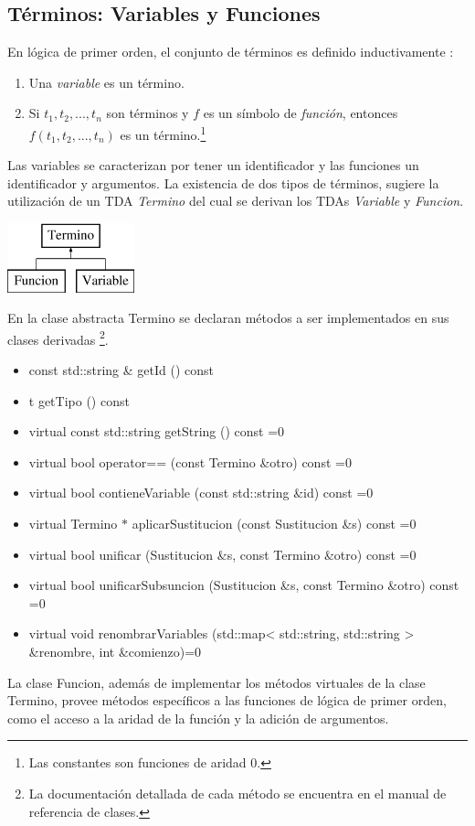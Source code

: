 \documentclass[a4paper,12pt]{article}
\begin{document}
\subsection{Términos: Variables y Funciones} %
En lógica de primer orden, el conjunto de términos es definido inductivamente \cite{ApuntesLogica}:
\begin{enumerate}
\item Una \emph{variable} es un término.
\item Si $t_1,t_2,...,t_n$ son términos y $f$ es un símbolo de \emph{función}, entonces $f(t_1,t_2,...,t_n)$
  es un término.\footnote{Las constantes son funciones de aridad 0.}
\end{enumerate}
Las variables se caracterizan por tener un identificador y las funciones un identificador y argumentos. La existencia de
dos tipos de términos, sugiere la utilización de un  TDA \emph{Termino} del cual se derivan los TDAs \emph{Variable} y 
\emph{Funcion}.
\begin{center}
\leavevmode
\includegraphics[height=2cm]{imagenes/classTermino}
\end{center}
En la clase abstracta Termino se declaran métodos a ser implementados en sus clases derivadas
\footnote{La documentación detallada de cada método se encuentra en el manual de referencia de clases.}.
\begin{itemize}
\renewcommand{\labelitemi}{$\bullet$}
\item const std::string \& getId () const
\item t getTipo () const
\item virtual const std::string getString () const =0
\item virtual bool operator== (const Termino \&otro) const =0
\item virtual bool contieneVariable (const std::string \&id) const =0
\item virtual Termino $\ast$ aplicarSustitucion (const Sustitucion \&s) const =0
\item virtual bool unificar (Sustitucion \&s, const Termino \&otro) const =0
\item virtual bool unificarSubsuncion (Sustitucion \&s, const Termino \&otro) const =0
\item virtual void renombrarVariables (std::map< std::string, std::string > \&renombre, int \&comienzo)=0
\end{itemize}
La clase Funcion, además de implementar los métodos virtuales de la clase Termino,
provee métodos específicos a las funciones de lógica de primer orden, como el acceso a la aridad
de la función y la adición de argumentos.
\end{document}
